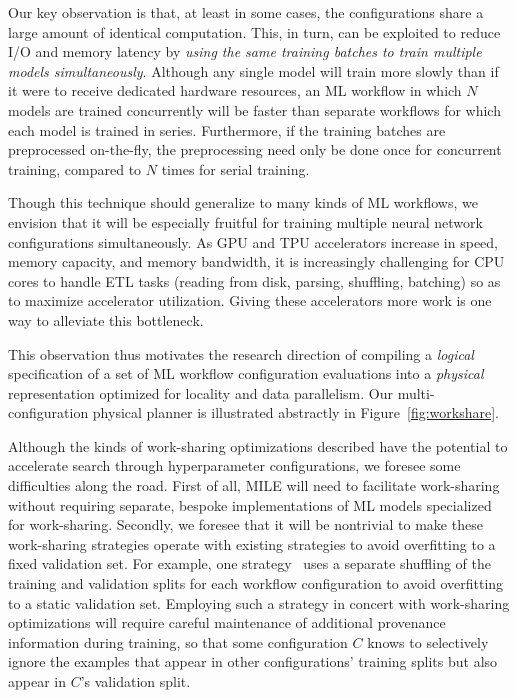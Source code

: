 \documentclass[11pt,dvipdfmx]{article}
\newcommand{\system}{{\sf MILE}\xspace}
\begin{document}
Our key observation is that, at least in some cases, the configurations share
a large amount of identical computation. This, in turn, can be exploited to
reduce I/O and memory latency by {\em using the same training batches to train
multiple models simultaneously}.
Although any single model will train more slowly than if it were to receive dedicated
hardware resources, an ML workflow in which $N$ models are trained concurrently
will be faster than separate workflows for which each model is trained in series.
Furthermore, if the training batches are preprocessed on-the-fly, the preprocessing
need only be done once for concurrent training, compared to $N$ times for serial training.

Though this technique should generalize to many kinds of ML workflows,
we envision that it will be especially fruitful
for training multiple neural network configurations simultaneously.
As GPU and TPU accelerators increase in speed, memory
capacity, and memory bandwidth, it is increasingly challenging
for CPU cores to handle ETL tasks (reading from disk, parsing,
shuffling, batching) so as to maximize accelerator utilization.
Giving these accelerators more work is one way to alleviate this bottleneck.

This observation thus motivates the research direction
of compiling a {\em logical} specification of a set of ML workflow
configuration evaluations into a {\em physical} representation optimized for
locality and data parallelism.
Our multi-configuration physical planner is illustrated abstractly in Figure~\ref{fig:workshare}.

Although the kinds of work-sharing optimizations described
have the potential to accelerate search through hyperparameter configurations, we foresee
some difficulties along the road. First of all, \system will need to facilitate work-sharing
without requiring separate, bespoke implementations of ML models specialized for work-sharing.
Secondly, we foresee that it will be
nontrivial to make these work-sharing strategies operate with existing strategies to avoid
overfitting to a fixed validation set. For example, one strategy~\cite{levesque2018bayesian} uses a separate shuffling
of the training and validation splits for each workflow configuration to avoid overfitting to
a static validation set. Employing such a strategy in concert with work-sharing optimizations will
require careful maintenance of additional provenance information during training, so that some configuration $C$
knows to selectively ignore the examples that appear in other configurations' training
splits but also appear in $C$'s validation split.
\end{document}
